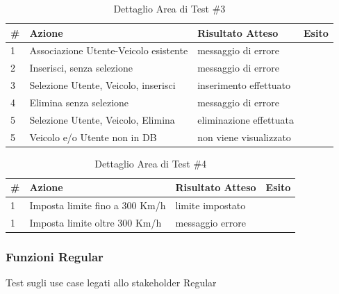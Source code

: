 \documentclass[a4paper,12pt]{article}
\begin{document}
\begin{table}[H]
\begin{center}
\caption{Dettaglio Area di Test \#3}
\begin{tabular}{p{0.5cm} p{7cm} p{4.5cm} p{1cm}}
\rowcolor{Ash}
\hline
\# & Azione & Risultato Atteso & Esito \\ \hline
1 & Associazione Utente-Veicolo esistente			&		messaggio di errore		&\cellcolor{green}{OK}\\
2 & Inserisci, senza selezione						&		messaggio di errore		&\cellcolor{green}{OK}\\
3 & Selezione Utente, Veicolo, inserisci				&		inserimento effettuato	&\cellcolor{green}{OK}\\
4 & Elimina senza selezione						&		messaggio di errore		&\cellcolor{green}{OK}\\
5 & Selezione Utente, Veicolo, Elimina				&		eliminazione effettuata	&\cellcolor{green}{OK}\\
5 & Veicolo e/o Utente non in DB					&		non viene visualizzato	&\cellcolor{green}{OK}\\ \hline
\end{tabular}
\end{center}
\end{table}

\begin{table}[H]
\begin{center}
\caption{Dettaglio Area di Test \#4}
\begin{tabular}{p{0.5cm} p{8cm} p{3.5cm} p{1cm}}
\rowcolor{Ash}
\hline
\# & Azione & Risultato Atteso & Esito \\ \hline
1 & Imposta limite fino a 300 Km/h	&	limite impostato		&	\cellcolor{green}{OK}\\
1 & Imposta limite oltre 300 Km/h	&		messaggio errore	&		\cellcolor{green}{OK}\\ \hline
\end{tabular}
\end{center}
\end{table}

\pagebreak

\subsubsection{Funzioni Regular}

Test sugli use case legati allo stakeholder Regular
\end{document}
